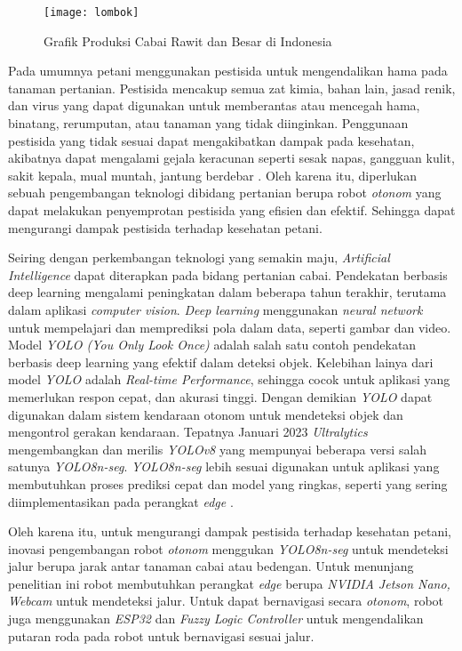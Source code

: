 \begin{figure}[H]
	\centering
	\texttt{[image: lombok]}
	\caption{Grafik Produksi Cabai Rawit dan Besar di Indonesia}
	\label{fig:grafik-lombok}
\end{figure}

Pada umumnya petani menggunakan pestisida untuk mengendalikan hama pada tanaman pertanian. Pestisida mencakup semua zat kimia, bahan lain, jasad renik, dan virus yang dapat digunakan untuk memberantas atau mencegah hama, binatang, rerumputan, atau tanaman yang tidak diinginkan. Penggunaan pestisida yang tidak sesuai dapat mengakibatkan dampak pada kesehatan, akibatnya dapat mengalami gejala keracunan seperti sesak napas, gangguan kulit, sakit kepala, mual muntah, jantung berdebar \cite{ibrahim2022identifikasi}. Oleh karena itu, diperlukan sebuah pengembangan teknologi dibidang pertanian berupa robot \textit{otonom} yang dapat melakukan penyemprotan pestisida yang efisien dan efektif. Sehingga dapat mengurangi dampak pestisida terhadap kesehatan petani.

Seiring dengan perkembangan teknologi yang semakin maju, \textit{Artificial Intelligence}  dapat diterapkan pada bidang pertanian cabai. Pendekatan berbasis deep learning mengalami peningkatan dalam beberapa tahun terakhir, terutama dalam aplikasi \textit{computer vision}. \textit{Deep learning} menggunakan \textit{neural network}  untuk mempelajari dan memprediksi pola dalam data, seperti gambar dan video. Model \textit{YOLO (You Only Look Once)} adalah salah satu contoh pendekatan berbasis deep learning yang efektif dalam deteksi objek. Kelebihan lainya dari model \textit{YOLO} adalah \textit{Real-time Performance}, sehingga cocok untuk aplikasi yang memerlukan respon cepat, dan akurasi tinggi\cite{sirisha2023statistical}. Dengan demikian \textit{YOLO} dapat digunakan dalam sistem kendaraan otonom untuk mendeteksi objek dan mengontrol gerakan kendaraan. Tepatnya Januari 2023 \textit{Ultralytics} mengembangkan dan merilis \textit{YOLOv8} yang mempunyai beberapa versi salah satunya \textit{YOLO8n-seg}. \textit{YOLO8n-seg} lebih sesuai digunakan untuk aplikasi yang membutuhkan proses prediksi cepat dan model yang ringkas, seperti yang sering diimplementasikan pada perangkat \textit{edge} \cite{10348569}.

Oleh karena itu, untuk mengurangi dampak pestisida terhadap kesehatan petani, inovasi pengembangan robot \textit{otonom}  menggukan \textit{YOLO8n-seg} untuk mendeteksi jalur berupa jarak antar tanaman cabai atau bedengan. Untuk menunjang penelitian ini robot  membutuhkan perangkat \textit{edge} berupa \textit{NVIDIA Jetson Nano, Webcam} untuk mendeteksi jalur. Untuk dapat bernavigasi secara \textit{otonom}, robot juga menggunakan \textit{ESP32} dan \textit{Fuzzy Logic Controller} untuk mengendalikan putaran roda pada robot untuk bernavigasi sesuai jalur. 


